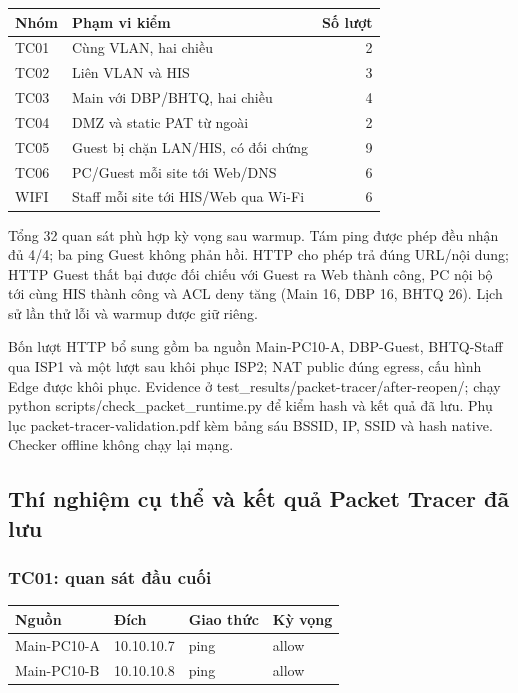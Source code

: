 {\def\LTcaptype{none} %
\begin{longtable}[]{@{}llr@{}}
\toprule\noalign{}
Nhóm & Phạm vi kiểm & Số lượt \\
\midrule\noalign{}
\endhead
\bottomrule\noalign{}
\endlastfoot
TC01 & Cùng VLAN, hai chiều & 2 \\
TC02 & Liên VLAN và HIS & 3 \\
TC03 & Main với DBP/BHTQ, hai chiều & 4 \\
TC04 & DMZ và static PAT từ ngoài & 2 \\
TC05 & Guest bị chặn LAN/HIS, có đối chứng & 9 \\
TC06 & PC/Guest mỗi site tới Web/DNS & 6 \\
WIFI & Staff mỗi site tới HIS/Web qua Wi-Fi & 6 \\
\end{longtable}
}

Tổng 32 quan sát phù hợp kỳ vọng sau warmup. Tám ping được phép đều nhận
đủ 4/4; ba ping Guest không phản hồi. HTTP cho phép trả đúng URL/nội
dung; HTTP Guest thất bại được đối chiếu với Guest ra Web thành công, PC
nội bộ tới cùng HIS thành công và ACL deny tăng (Main 16, DBP 16, BHTQ
26). Lịch sử lần thử lỗi và warmup được giữ riêng.

Bốn lượt HTTP bổ sung gồm ba nguồn Main-PC10-A, DBP-Guest, BHTQ-Staff
qua ISP1 và một lượt sau khôi phục ISP2; NAT public đúng egress, cấu
hình Edge được khôi phục. Evidence ở
test\_results/packet-tracer/after-reopen/; chạy python
scripts/check\_packet\_runtime.py để kiểm hash và kết quả đã lưu. Phụ
lục packet-tracer-validation.pdf kèm bảng sáu BSSID, IP, SSID và hash
native. Checker offline không chạy lại mạng.

\FloatBarrier
\subsection{Thí nghiệm cụ thể và kết quả Packet Tracer đã
lưu}\label{thuxed-nghiux1ec7m-cux1ee5-thux1ec3-vuxe0-kux1ebft-quux1ea3-packet-tracer-ux111uxe3-lux1b0u}

\subsubsection{TC01: quan sát đầu
cuối}\label{tc01-quan-suxe1t-ux111ux1ea7u-cuux1ed1i}

{\def\LTcaptype{none} %
\begin{longtable}[]{@{}llll@{}}
\toprule\noalign{}
Nguồn & Đích & Giao thức & Kỳ vọng \\
\midrule\noalign{}
\endhead
\bottomrule\noalign{}
\endlastfoot
Main-PC10-A & 10.10.10.7 & ping & allow \\
Main-PC10-B & 10.10.10.8 & ping & allow \\
\end{longtable}
}

